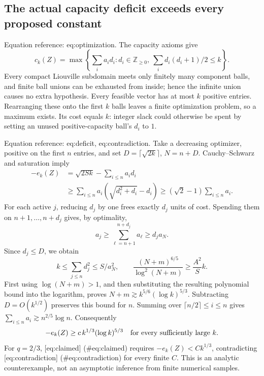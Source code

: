 \documentclass[10pt]{article}
\begin{document}
\subsection*{The actual capacity deficit exceeds every proposed constant}
Equation reference: eq:optimization. The capacity axioms give \[
 c_k(Z)=\max\left\{\sum_i a_i d_i:
 d_i\in\mathbb Z_{\ge0},\
 \sum_i d_i(d_i+1)/2\le k\right\}.\] Every compact Liouville subdomain meets only finitely many component balls, and finite ball unions can be exhausted from inside; hence the infinite union causes no extra hypothesis. Every feasible vector has at most \(k\) positive entries. Rearranging these onto the first \(k\) balls leaves a finite optimization problem, so a maximum exists. Its cost equals \(k\): integer slack could otherwise be spent by setting an unused positive-capacity ball’s \(d_i\) to \(1\).\par
Equation reference: eq:deficit, eq:contradiction. Take a decreasing optimizer, positive on the first \(n\) entries, and set \(D=\lceil\sqrt{2k}\rceil\), \(N=n+D\). Cauchy–Schwarz and saturation imply \[\begin{aligned}
 -e_k(Z)
 &=\sqrt{2Sk}-\sum_{i\le n}a_i d_i\\
 &\ge\sum_{i\le n}a_i(\sqrt{d_i^2+d_i}-d_i)
 \ge(\sqrt2-1)\sum_{i\le n}a_i.\end{aligned}\] For each active \(j\), reducing \(d_j\) by one frees exactly \(d_j\) units of cost. Spending them on \(n+1,\ldots,n+d_j\) gives, by optimality, \[a_j\ge\sum_{\ell=n+1}^{n+d_j}a_\ell\ge d_j a_N.\] Since \(d_j\le D\), we obtain \[k\le\sum_{j\le n}d_j^2\le S/a_N^2,\qquad
 \frac{(N+m)^{6/5}}{\log^2(N+m)}\ge \frac{A^2}{S}k.\] First using \(\log(N+m)>1\), and then substituting the resulting polynomial bound into the logarithm, proves \(N+m\gtrsim k^{5/6}(\log k)^{5/3}\). Subtracting \(D=O(k^{1/2})\) preserves this bound for \(n\). Summing over \(\lceil n/2\rceil\le i\le n\) gives \(\sum_{i\le n}a_i\gtrsim n^{2/5}\log n\). Consequently \[
 -e_k(Z)\ge c\,k^{1/3}(\log k)^{5/3}
 \quad\hbox{for every sufficiently large }k.\] For \(q=2/3\), [eq:claimed] (\#eq:claimed) requires \(-e_k(Z)<Ck^{1/3}\), contradicting [eq:contradiction] (\#eq:contradiction) for every finite \(C\). This is an analytic counterexample, not an asymptotic inference from finite numerical samples.\par
\end{document}
